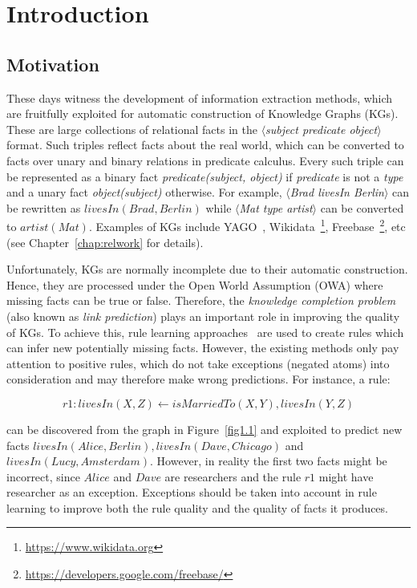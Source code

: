 \chapter{Introduction}
\label{chap:intro}

\section{Motivation}
\label{chap:motivation}

These days witness the development of information extraction methods, which are fruitfully exploited for automatic construction of Knowledge Graphs (KGs). These are large collections of relational facts in the \textit{$\langle$subject predicate object$\rangle$} format. Such triples reflect facts about the real world, which can be converted to facts over unary and binary relations in predicate calculus. Every such triple can be represented as a binary fact \textit{predicate(subject, object)} if \textit{predicate} is not a \textit{type} and a unary fact \textit{object(subject)} otherwise. For example, \textit{$\langle$Brad livesIn Berlin$\rangle$} can be rewritten as $livesIn(Brad, Berlin)$ while \textit{$\langle$Mat type artist$\rangle$} can be converted to $artist(Mat)$. Examples of KGs include YAGO~\cite{ref28}, Wikidata~\footnote{\url{https://www.wikidata.org}}, Freebase~\footnote{\url{https://developers.google.com/freebase/}}, etc (see Chapter~\ref{chap:relwork} for details).

Unfortunately, KGs are normally incomplete due to their automatic construction. Hence, they are processed under the Open World Assumption (OWA) where missing facts can be true or false. Therefore, the \textit{knowledge completion problem} (also known as \textit{link prediction}) plays an important role in improving the quality of KGs. To achieve this, rule learning approaches~\cite{ref39, ref10} are used to create rules which can infer new potentially missing facts. However, the existing methods only pay attention to positive rules, which do not take exceptions (negated atoms) into consideration and may therefore make wrong predictions. For instance, a rule:

\begin{equation}
r1: livesIn(X,Z) \leftarrow isMarriedTo(X,Y), livesIn(Y,Z)
\end{equation}
\label{rule1}

\noindent can be discovered from the graph in Figure~\ref{fig1.1} and exploited to predict new facts $livesIn(Alice, Berlin), livesIn(Dave, Chicago)$ and $livesIn(Lucy, Amsterdam)$. However, in reality the first two facts might be incorrect, since $Alice$ and $Dave$ are researchers and the rule $r1$ might have researcher as an exception. Exceptions should be taken into account in rule learning to improve both the rule quality and the quality of facts it produces.

